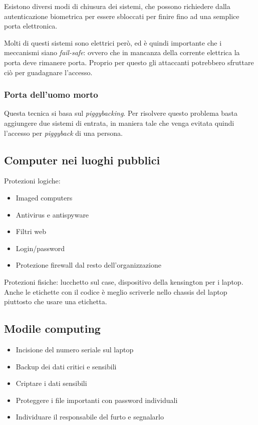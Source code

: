Esistono diversi modi di chiusura dei sistemi, che possono richiedere dalla 
autenticazione biometrica per essere sbloccati per finire fino ad una semplice 
porta elettronica.

Molti di questi sistemi sono elettrici però, ed è quindi importante che i 
meccanismi siano \textit{fail-safe}: ovvero che in mancanza della corrente 
elettrica la porta deve rimanere porta. Proprio per questo gli attaccanti 
potrebbero sfruttare ciò per guadagnare l'accesso.

\subsubsection{Porta dell'uomo morto}

Questa tecnica si basa sul \textit{piggybacking}. Per risolvere questo problema 
basta aggiungere due sistemi di entrata, in maniera tale che venga evitata 
quindi l'accesso per \textit{piggyback} di una persona.


\subsection{Computer nei luoghi pubblici}

Protezioni logiche:
\begin{itemize}
\item Imaged computers
\item Antivirus e antispyware
\item Filtri web
\item Login/password
\item Protezione firewall dal resto dell'organizzazione
\end{itemize}

Protezioni fisiche: lucchetto sul case, dispositivo della kensington per i 
laptop. Anche le etichette con il codice è meglio scriverle nello chassis del 
laptop piuttosto che usare una etichetta.

\subsection{Modile computing}

\begin{itemize}
\item Incisione del numero seriale sul laptop
\item Backup dei dati critici e sensibili
\item Criptare i dati sensibili
\item Proteggere i file importanti con password individuali
\item Individuare il responsabile del furto e segnalarlo
\end{itemize}


